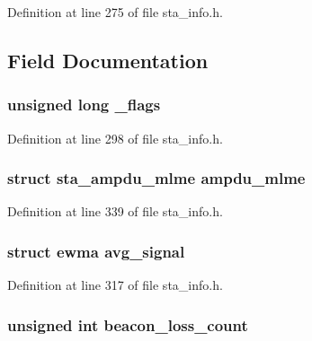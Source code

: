 Definition at line 275 of file sta\-\_\-info.\-h.



\subsection{Field Documentation}
\hypertarget{structsta__info_a8d0d1e503953e175f5716febfded04f0}{
\subsubsection[{\-\_\-flags}]{\setlength{\rightskip}{0pt plus 5cm}unsigned long \-\_\-flags}}\label{structsta__info_a8d0d1e503953e175f5716febfded04f0}


Definition at line 298 of file sta\-\_\-info.\-h.

\hypertarget{structsta__info_ad42a305af8f3528d28546f33350e4473}{
\subsubsection[{ampdu\-\_\-mlme}]{\setlength{\rightskip}{0pt plus 5cm}struct {\bf sta\-\_\-ampdu\-\_\-mlme} ampdu\-\_\-mlme}}\label{structsta__info_ad42a305af8f3528d28546f33350e4473}


Definition at line 339 of file sta\-\_\-info.\-h.

\hypertarget{structsta__info_aa7659d752f4407855f0c482afbcd879f}{
\subsubsection[{avg\-\_\-signal}]{\setlength{\rightskip}{0pt plus 5cm}struct ewma avg\-\_\-signal}}\label{structsta__info_aa7659d752f4407855f0c482afbcd879f}


Definition at line 317 of file sta\-\_\-info.\-h.

\hypertarget{structsta__info_a2d5a8a52432b6f6ab32bcb069ca3115a}{
\subsubsection[{beacon\-\_\-loss\-\_\-count}]{\setlength{\rightskip}{0pt plus 5cm}unsigned int beacon\-\_\-loss\-\_\-count}}\label{structsta__info_a2d5a8a52432b6f6ab32bcb069ca3115a}


